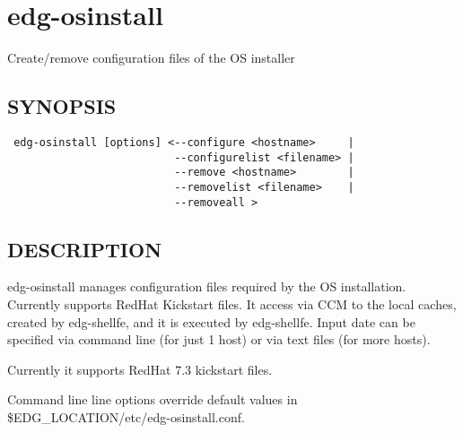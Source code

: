 \section{edg-osinstall\label{edg-osinstall}}


Create/remove configuration files of the OS installer

\subsection*{SYNOPSIS\label{edg-osinstall_SYNOPSIS}}
\begin{verbatim}
 edg-osinstall [options] <--configure <hostname>     |
                          --configurelist <filename> |
                          --remove <hostname>        |
                          --removelist <filename>    |
                          --removeall >
\end{verbatim}
\subsection*{DESCRIPTION\label{edg-osinstall_DESCRIPTION}}


edg-osinstall manages configuration files required by the OS installation. Currently
supports RedHat Kickstart files. It access via CCM to the local caches, created
by edg-shellfe, and it is executed by edg-shellfe. Input date
can be specified via command line (for just 1 host) or via text files (for more hosts).



Currently it supports RedHat 7.3 kickstart files.



Command line line options override default values in \$EDG\_LOCATION/etc/edg-osinstall.conf.

